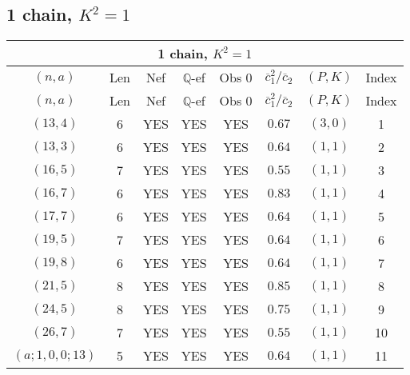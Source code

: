 \subsection{1 chain, $K^2 = 1$}
\begin{longtable}{|c|c|c|c|c|c|c|c|}
\hline
\multicolumn{8}{|c|}{1 chain, $K^2 = 1$}\\
\hline
$(n,a)$ & Len & Nef & $\mathbb Q$-ef & Obs 0 & $\overline c_1^2 / \overline c_2$ & $(P,K)$ & Index\\
\hline
\endfirsthead

\hline
$(n,a)$ & Len & Nef & $\mathbb Q$-ef & Obs 0 & $\overline c_1^2 / \overline c_2$ & $(P,K)$ & Index\\
\hline
\endhead
\hline
\endfoot

$(13,4)$ & 6 & YES & YES & YES & $0.67$ & $(3,0)$ & 1\\
$(13,3)$ & 6 & YES & YES & YES & $0.64$ & $(1,1)$ & 2\\
$(16,5)$ & 7 & YES & YES & YES & $0.55$ & $(1,1)$ & 3\\
$(16,7)$ & 6 & YES & YES & YES & $0.83$ & $(1,1)$ & 4\\
$(17,7)$ & 6 & YES & YES & YES & $0.64$ & $(1,1)$ & 5\\
$(19,5)$ & 7 & YES & YES & YES & $0.64$ & $(1,1)$ & 6\\
$(19,8)$ & 6 & YES & YES & YES & $0.64$ & $(1,1)$ & 7\\
$(21,5)$ & 8 & YES & YES & YES & $0.85$ & $(1,1)$ & 8\\
$(24,5)$ & 8 & YES & YES & YES & $0.75$ & $(1,1)$ & 9\\
$(26,7)$ & 7 & YES & YES & YES & $0.55$ & $(1,1)$ & 10\\
$(a;1,0,0;13)$ & 5 & YES & YES & YES & $0.64$ & $(1,1)$ & 11
\end{longtable}

